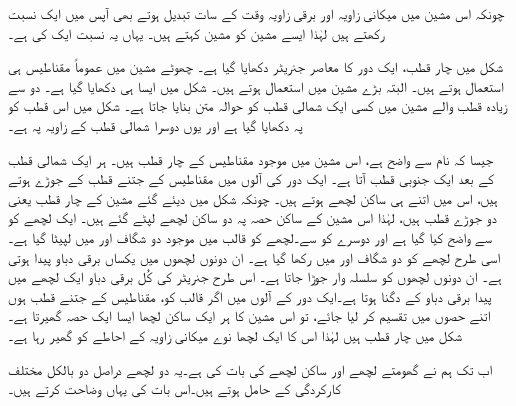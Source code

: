 چونکہ اس مشین میں  میکانی زاویہ  اور برقی زاویہ  وقت کے سات تبدیل ہوتے بھی آپس میں ایک نسبت رکھتے ہیں لہٰذا ایسے مشین کو  مشین  کہتے ہیں۔ یہاں یہ نسبت ایک کی ہے۔ 

شکل   میں چار قطب، ایک دور کا معاصر جنریٹر دکھایا گیا ہے۔ چھوٹے مشین میں عموماً مقناطیس ہی استعمال ہوتے ہیں۔ البتہ بڑے مشین میں  استعمال ہوتے ہیں۔ شکل   میں ایسا ہی دکھایا گیا ہے۔ دو سے زیادہ قطب والے مشین میں کسی ایک شمالی قطب کو حوالہ متن بنایا جاتا ہے۔ شکل میں اس قطب کو  پہ دکھایا گیا ہے اور یوں دوسرا شمالی قطب  کے زاویہ پہ ہے۔

 جیسا کہ نام سے واضح ہے، اس مشین میں موجود  مقناطیس کے چار قطب  ہیں۔ ہر ایک شمالی قطب کے بعد ایک جنوبی قطب آتا ہے۔ ایک دور کی آلوں میں مقناطیس کے جتنے  قطب کے جوڑے ہوتے ہیں، اس میں  اتنے ہی ساکن لچھے ہوتے ہیں۔ چونکہ شکل  میں دیئے گئے مشین کے چار قطب یعنی دو جوڑے قطب ہیں،  لہٰذا اس مشین کے ساکن حصہ پہ دو ساکن لچھے لپٹے  گئے ہیں۔ ایک لچھے کو  سے واضح کیا گیا ہے اور دوسرے کو  سے۔لچھے  کو  قالب میں موجود دو شگاف  اور  میں لپیٹا گیا ہے۔ اسی طرح  لچھے کو دو شگاف  اور  میں رکھا گیا ہے۔ ان دونوں لچھوں میں یکساں برقی دباو پیدا ہوتی ہے۔ ان دونوں لچھوں کو سلسلہ وار جوڑا جاتا ہے۔ اس طرح جنریٹر کی کُل برقی دباو ایک لچھے میں پیدا  برقی دباو کے دگنا ہوتا ہے۔ایک دور کے آلوں میں  اگر قالب کو، مقناطیس کے جتنے قطب ہوں اتنے حصوں میں تقسیم کر لیا جائے، تو اس مشین کا ہر ایک ساکن لچھا ایسا ایک حصہ گھیرتا ہے۔ شکل میں چار  قطب  ہیں  لہٰذا اس کا ایک لچھا  نوے میکانی زاویہ کے احاطے کو گھیر رہا ہے۔

اب تک ہم نے گھومتے لچھے اور ساکن لچھے کی بات کی ہے۔یہ دو لچھے دراصل دو بالکل مختلف کارکردگی کے حامل ہوتے ہیں۔اس بات کی  یہاں وضاحت کرتے ہیں۔

